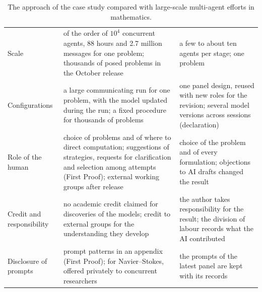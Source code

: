 \begin{table}[ht]
\begin{tabularx}{\textwidth}{@{}>{\raggedright\arraybackslash}p{2.6cm}>{\raggedright\arraybackslash}X>{\raggedright\arraybackslash}X@{}}
Scale & of the order of $10^4$ concurrent agents, 88 hours and 2.7 million messages for one problem; thousands
  of posed problems in the October release & a few to about ten agents per stage; one problem\\
Configurations & a large communicating run for one problem, with the model updated during the run; a fixed
  procedure for thousands of problems & one panel design, reused with new roles for the revision; several model
  versions across sessions (declaration)\\
Role of the human & choice of problems and of where to direct computation; suggestions of strategies, requests
  for clarification and selection among attempts (First Proof); external working groups after release
  & choice of the problem and of every formulation; objections to AI drafts changed the result\\
Credit and responsibility & no academic credit claimed for discoveries of the models; credit to external groups
  for the understanding they develop & the author takes responsibility for the result; the division of labour
  records what the AI contributed\\
Disclosure of prompts & prompt patterns in an appendix (First Proof); for Navier--Stokes, offered privately to
  concurrent researchers & the prompts of the latest panel are kept with its records\\
\bottomrule
\end{tabularx}
\caption{The approach of the case study compared with large-scale multi-agent efforts in mathematics.}\label{tab:compare}
\end{table}

